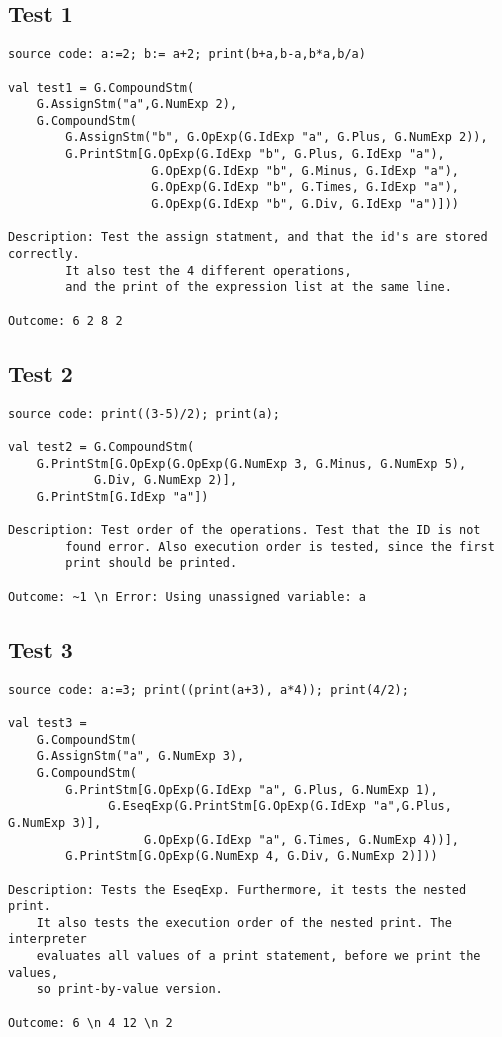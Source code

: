 \documentclass[a4paper]{article}
\begin{document}
\subsection{Test 1}
\begin{lstlisting}
source code: a:=2; b:= a+2; print(b+a,b-a,b*a,b/a)

val test1 = G.CompoundStm(
	G.AssignStm("a",G.NumExp 2),
	G.CompoundStm(
	    G.AssignStm("b", G.OpExp(G.IdExp "a", G.Plus, G.NumExp 2)),
	    G.PrintStm[G.OpExp(G.IdExp "b", G.Plus, G.IdExp "a"),
	    			G.OpExp(G.IdExp "b", G.Minus, G.IdExp "a"),
	    			G.OpExp(G.IdExp "b", G.Times, G.IdExp "a"),
	    			G.OpExp(G.IdExp "b", G.Div, G.IdExp "a")]))

Description: Test the assign statment, and that the id's are stored correctly.
		It also test the 4 different operations, 
		and the print of the expression list at the same line.

Outcome: 6 2 8 2
\end{lstlisting}

\subsection{Test 2}
\begin{lstlisting}
source code: print((3-5)/2); print(a);

val test2 = G.CompoundStm(
	G.PrintStm[G.OpExp(G.OpExp(G.NumExp 3, G.Minus, G.NumExp 5),
			G.Div, G.NumExp 2)],
	G.PrintStm[G.IdExp "a"])

Description: Test order of the operations. Test that the ID is not
		found error. Also execution order is tested, since the first 
		print should be printed.

Outcome: ~1 \n Error: Using unassigned variable: a
\end{lstlisting}

\subsection{Test 3}
\begin{lstlisting}
source code: a:=3; print((print(a+3), a*4)); print(4/2);

val test3 = 
    G.CompoundStm(
	G.AssignStm("a", G.NumExp 3),
	G.CompoundStm(
	    G.PrintStm[G.OpExp(G.IdExp "a", G.Plus, G.NumExp 1), 
		      G.EseqExp(G.PrintStm[G.OpExp(G.IdExp "a",G.Plus, G.NumExp 3)],
			       G.OpExp(G.IdExp "a", G.Times, G.NumExp 4))],
	    G.PrintStm[G.OpExp(G.NumExp 4, G.Div, G.NumExp 2)]))

Description: Tests the EseqExp. Furthermore, it tests the nested print.
	It also tests the execution order of the nested print. The interpreter
	evaluates all values of a print statement, before we print the values,
	so print-by-value version. 

Outcome: 6 \n 4 12 \n 2
\end{lstlisting}
\end{document}
